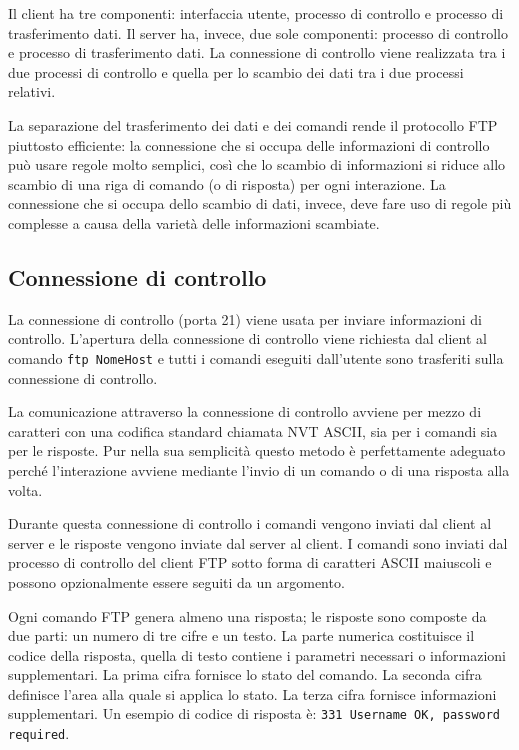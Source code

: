 Il client ha tre componenti: interfaccia utente, processo di controllo e processo di trasferimento dati. Il server ha, invece, due sole componenti: processo di controllo e processo di trasferimento dati. La connessione di controllo viene realizzata tra i due processi di controllo e quella per lo scambio dei dati tra i due processi relativi.

La separazione del trasferimento dei dati e dei comandi rende il protocollo FTP piuttosto efficiente: la connessione che si occupa delle informazioni di controllo può usare regole molto semplici, così che lo scambio di informazioni si riduce allo scambio di una riga di comando (o di risposta) per ogni interazione. La connessione che si occupa dello scambio di dati, invece, deve fare uso di regole più complesse a causa della varietà delle informazioni scambiate.

\subsection{Connessione di controllo}
La connessione di controllo (porta 21) viene usata per inviare informazioni di controllo. L’apertura della connessione di controllo viene richiesta dal client al comando \verb|ftp NomeHost| e tutti i comandi eseguiti dall’utente sono trasferiti sulla connessione di controllo.

La comunicazione attraverso la connessione di controllo avviene per mezzo di caratteri con una codifica standard chiamata NVT ASCII, sia per i comandi sia per le risposte. Pur nella sua semplicità questo metodo è perfettamente adeguato perché l'interazione avviene mediante l'invio di un comando o di una risposta alla volta.

Durante questa connessione di controllo i comandi vengono inviati dal client al server e le risposte vengono inviate dal server al client. I comandi sono inviati dal processo di controllo del client FTP sotto forma di caratteri ASCII maiuscoli e possono opzionalmente essere seguiti da un argomento.

Ogni comando FTP genera almeno una risposta; le risposte sono composte da due parti: un numero di tre cifre e un testo. La parte numerica costituisce il codice della risposta, quella di testo contiene i parametri necessari o informazioni supplementari. La prima cifra fornisce lo stato del comando. La seconda cifra definisce l'area alla quale si applica lo stato. La terza cifra fornisce informazioni supplementari. Un esempio di codice di risposta è: \texttt{331 Username OK,
password required}.


